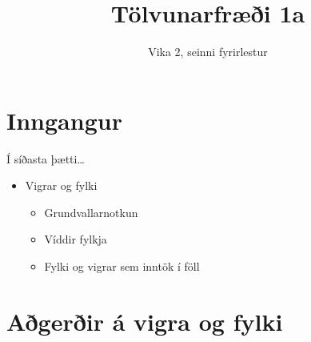 \documentclass{beamer}
\title{Tölvunarfræði 1a}
\subtitle{Vika 2, seinni fyrirlestur}
\begin{document}
\begin{frame}
\titlepage
\end{frame}

\section{Inngangur}

\begin{frame}{Í síðasta þætti\ldots}
\begin{itemize}
 \item Vigrar og fylki
 \begin{itemize}
  \item Grundvallarnotkun
  \item Víddir fylkja
  \item Fylki og vigrar sem inntök í föll
 \end{itemize}
\end{itemize}
\end{frame}

\section{Aðgerðir á vigra og fylki}
\end{document}
